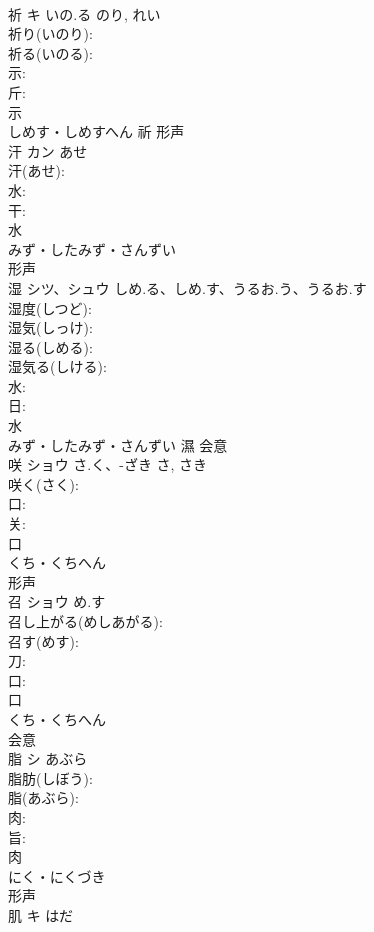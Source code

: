 \documentclass[8pt]{extreport}
\begin{document}
\begin{CJK}{UTF8}{min}
\\	祈	キ	いの.る	のり, れい	
\\	祈り(いのり): 
\\	祈る(いのる): 
\\	示: 
\\	斤: 
\\	示	
\\	しめす・しめすへん	祈	形声 
\\	汗	カン	あせ		
\\	汗(あせ): 
\\	水: 
\\	干: 
\\	水	
\\	みず・したみず・さんずい	
\\	形声 
\\	湿	シツ、シュウ	しめ.る、しめ.す、うるお.う、うるお.す		
\\	湿度(しつど): 
\\	湿気(しっけ): 
\\	湿る(しめる): 
\\	湿気る(しける): 
\\	水: 
\\	日: 
\\	水	
\\	みず・したみず・さんずい	濕	会意 
\\	咲	ショウ	さ.く、-ざき	さ, さき	
\\	咲く(さく): 
\\	口: 
\\	关: 
\\	口	
\\	くち・くちへん	
\\	形声 
\\	召	ショウ	め.す		
\\	召し上がる(めしあがる): 
\\	召す(めす): 
\\	刀: 
\\	口: 
\\	口	
\\	くち・くちへん	
\\	会意 
\\	脂	シ	あぶら		
\\	脂肪(しぼう): 
\\	脂(あぶら): 
\\	肉: 
\\	旨: 
\\	肉	
\\	にく・にくづき	
\\	形声 
\\	肌	キ	はだ		

\end{CJK}
\end{document}
